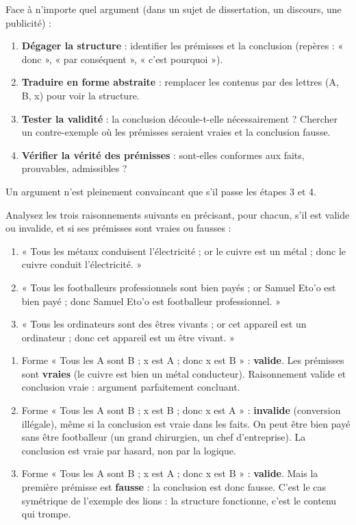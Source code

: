 \documentclass[11pt]{article}
\begin{document}
\begin{methode}
Face à n'importe quel argument (dans un sujet de dissertation, un discours, une publicité) :
\begin{enumerate}
\item \textbf{Dégager la structure} : identifier les prémisses et la conclusion (repères : « donc », « par conséquent », « c'est pourquoi »).
\item \textbf{Traduire en forme abstraite} : remplacer les contenus par des lettres (A, B, x) pour voir la structure.
\item \textbf{Tester la validité} : la conclusion découle-t-elle nécessairement ? Chercher un contre-exemple où les prémisses seraient vraies et la conclusion fausse.
\item \textbf{Vérifier la vérité des prémisses} : sont-elles conformes aux faits, prouvables, admissibles ?
\end{enumerate}
Un argument n'est pleinement convaincant que s'il passe les étapes 3 et 4.
\end{methode}

\begin{exercice}
Analysez les trois raisonnements suivants en précisant, pour chacun, s'il est valide ou invalide, et si ses prémisses sont vraies ou fausses :
\begin{enumerate}
\item « Tous les métaux conduisent l'électricité ; or le cuivre est un métal ; donc le cuivre conduit l'électricité. »
\item « Tous les footballeurs professionnels sont bien payés ; or Samuel Eto'o est bien payé ; donc Samuel Eto'o est footballeur professionnel. »
\item « Tous les ordinateurs sont des êtres vivants ; or cet appareil est un ordinateur ; donc cet appareil est un être vivant. »
\end{enumerate}
\end{exercice}

\begin{corrige}
\begin{enumerate}
\item Forme « Tous les A sont B ; x est A ; donc x est B » : \textbf{valide}. Les prémisses sont \textbf{vraies} (le cuivre est bien un métal conducteur). Raisonnement valide et conclusion vraie : argument parfaitement concluant.
\item Forme « Tous les A sont B ; x est B ; donc x est A » : \textbf{invalide} (conversion illégale), même si la conclusion est vraie dans les faits. On peut être bien payé sans être footballeur (un grand chirurgien, un chef d'entreprise). La conclusion est vraie par hasard, non par la logique.
\item Forme « Tous les A sont B ; x est A ; donc x est B » : \textbf{valide}. Mais la première prémisse est \textbf{fausse} : la conclusion est donc fausse. C'est le cas symétrique de l'exemple des lions : la structure fonctionne, c'est le contenu qui trompe.
\end{enumerate}
\end{corrige}
\end{document}
